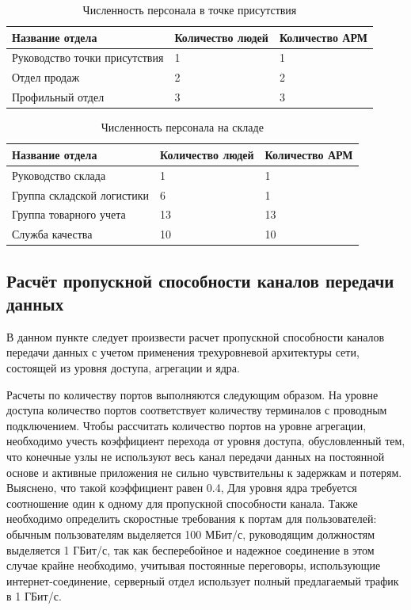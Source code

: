 \documentclass[14pt, a4paper]{extarticle}
\numberwithin{equation}{section}
\begin{document}
\begin{table}[H]
\centering
\small
\caption{Численность персонала в точке присутствия}
\label{table:tpPopul}
\begin{tabular}{|m{5cm}|m{3cm}|m{3cm}|}
\hline
\textbf{Название отдела} & \textbf{Количество людей} & \textbf{Количество АРМ} \\
\hline
Руководство точки присутствия & 1 & 1 \\
\hline
Отдел продаж & 2 & 2 \\
\hline
Профильный отдел & 3 & 3 \\
\hline
\end{tabular}
\end{table}


\begin{table}[H]
\centering
\small
\caption{Численность персонала на складе}
\label{table:warehousePopul}
\begin{tabular}{|m{4cm}|m{3cm}|m{3cm}|}
\hline
\textbf{Название отдела} & \textbf{Количество людей} & \textbf{Количество АРМ} \\
\hline
Руководство склада & 1 & 1 \\
\hline
Группа складской логистики & 6 & 1 \\
\hline
Группа товарного учета & 13 & 13 \\
\hline
Служба качества & 10 & 10 \\
\hline
\end{tabular}
\end{table}


\subsection{Расчёт пропускной способности каналов передачи данных}
В данном пункте следует произвести расчет пропускной способности каналов передачи 
данных с учетом применения трехуровневой архитектуры сети, состоящей 
из уровня доступа, агрегации и ядра. 

Расчеты по количеству портов выполняются следующим образом.
На уровне доступа количество портов соответствует количеству терминалов 
с проводным подключением. 
Чтобы рассчитать количество портов на уровне агрегации, необходимо 
учесть коэффициент перехода от уровня доступа, обусловленный тем, 
что конечные узлы не используют весь канал передачи данных на 
постоянной основе и активные приложения не сильно 
чувствительны к задержкам и потерям. Выяснено, что такой коэффициент равен 0.4,
Для уровня ядра требуется соотношение один к одному для пропускной способности канала.
Также необходимо определить скоростные требования
к портам для пользователей: обычным пользователям выделяется 
100 МБит/с, руководящим должностям выделяется 1 ГБит/с, так как 
бесперебойное и надежное соединение в 
этом случае крайне необходимо, учитывая постоянные 
переговоры, использующие интернет-соединение, серверный отдел 
использует полный предлагаемый трафик в 1 ГБит/с. 
\end{document}
